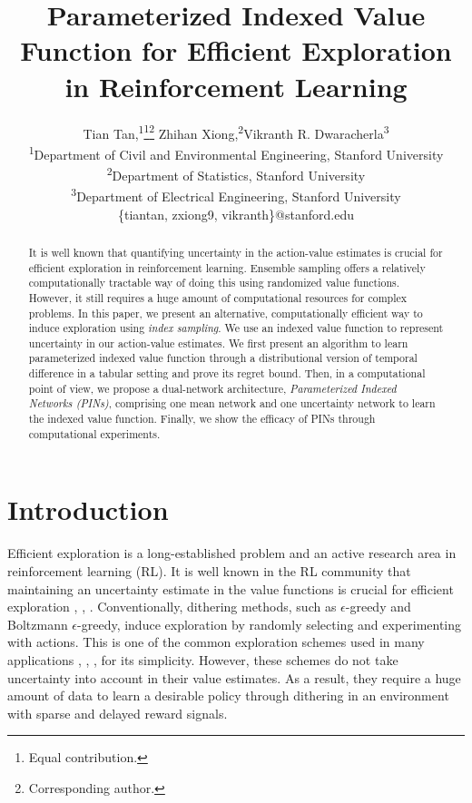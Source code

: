 \documentclass[letterpaper]{article} %
\title{Parameterized Indexed Value Function for Efficient Exploration \\ in Reinforcement Learning}
\author{
Tian Tan,\textsuperscript{\rm 1}\thanks{Equal contribution.}\setcounter{auxFootnote}{\value{footnote}}\thanks{Corresponding author.}
Zhihan Xiong,\textsuperscript{\rm 2}\footnotemark[\value{auxFootnote}]
Vikranth R. Dwaracherla\textsuperscript{\rm 3}\\ %
\textsuperscript{\rm 1}Department of Civil and Environmental Engineering, Stanford University\\
\textsuperscript{\rm 2}Department of Statistics, Stanford University\\
\textsuperscript{\rm 3}Department of Electrical Engineering, Stanford University\\
\{tiantan, zxiong9, vikranth\}@stanford.edu
}
\theoremstyle{definition}
\begin{document}
\maketitle

\begin{abstract}
It is well known that quantifying uncertainty in the action-value estimates is crucial for efficient exploration in reinforcement learning. Ensemble sampling offers a relatively computationally tractable way of doing this using randomized value functions. However, it still requires a huge amount of computational resources for complex problems. In this paper, we present an alternative, computationally efficient way to induce exploration using \emph{index sampling}. We use an indexed value function to represent uncertainty in our action-value estimates. We first present an algorithm to learn parameterized indexed value function through a distributional version of temporal difference in a tabular setting and prove its regret bound. Then, in a computational point of view, we propose a dual-network architecture, \emph{Parameterized Indexed Networks (PINs)}, comprising one mean network and one uncertainty network to learn the indexed value function. Finally, we show the efficacy of PINs through computational experiments.


\end{abstract}


\section{Introduction}
Efficient exploration is a long-established problem and an active research area in reinforcement learning (RL). It is well known in the RL community that maintaining an uncertainty estimate in the value functions is crucial for efficient exploration \cite{russo2018tutorial}, \cite{ghavamzadeh2015bayesian}, \cite{osband2018randomized}. Conventionally, dithering methods, such as $\epsilon$-greedy and Boltzmann $\epsilon$-greedy, induce exploration by randomly selecting and experimenting with actions. This is one of the common exploration schemes used in many applications \cite{mnih2015human}, \cite{he2015deep}, \cite{tan2019cooperative}, for its simplicity. However, these schemes do not take uncertainty into account in their value estimates. As a result, they require a huge amount of data to learn a desirable policy through dithering in an environment with sparse and delayed reward signals.
\end{document}
